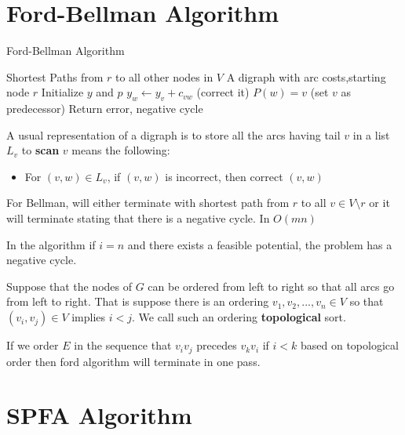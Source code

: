 		\section{Ford-Bellman Algorithm}
			\begin{algorithm}
				\caption{Ford-Bellman Algorithm}
				\begin{algorithmic}
					\ENSURE Shortest Paths from $r$ to all other nodes in $V$
					\REQUIRE A digraph with arc costs,starting node $r$
					\STATE Initialize $y$ and $p$
								\STATE $y_w \gets y_v + c_{vw}$ (correct it)
								\STATE $P(w) = v$ (set $v$ as predecessor)
							\ENDIF
						\ENDFOR
					\ENDFOR
							\STATE Return error, negative cycle
						\ENDIF
					\ENDFOR
				\end{algorithmic}
			\end{algorithm}

			A usual representation of a digraph is to store all the arcs having tail $v$ in a list $L_v$ to \textbf{scan} $v$ means the following:
			\begin{itemize}
				\item For $(v, w) \in L_v$, if $(v, w)$ is incorrect, then correct $(v, w)$
			\end{itemize}

			For Bellman, will either terminate with shortest path from $r$ to all $v\in V\setminus r$ or it will terminate stating that there is a negative cycle. In $O(mn)$

			In the algorithm if $i = n$ and there exists a feasible potential, the problem has a negative cycle.

			Suppose that the nodes of $G$ can be ordered from left to right so that all arcs go from left to right. That is suppose there is an ordering $v_1, v_2, ..., v_n \in V$ so that $(v_i, v_j) \in V$ implies $i < j$. We call such an ordering \textbf{topological} sort.

			If we order $E$ in the sequence that $v_iv_j$ precedes $v_kv_i$ if $i<k$ based on topological order then ford algorithm will terminate in one pass.

		\section{SPFA Algorithm}

